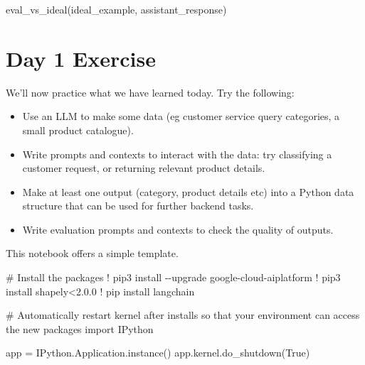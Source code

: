 \documentclass[
  letterpaper,
  DIV=11,
  numbers=noendperiod]{scrreprt}
\newenvironment{Shaded}{\begin{snugshade}}{\end{snugshade}}
\newcommand{\CommentTok}[1]{\textcolor[rgb]{0.37,0.37,0.37}{#1}}
\newcommand{\FloatTok}[1]{\textcolor[rgb]{0.68,0.00,0.00}{#1}}
\newcommand{\ImportTok}[1]{\textcolor[rgb]{0.00,0.46,0.62}{#1}}
\newcommand{\NormalTok}[1]{\textcolor[rgb]{0.00,0.23,0.31}{#1}}
\newcommand{\OperatorTok}[1]{\textcolor[rgb]{0.37,0.37,0.37}{#1}}
\newcommand{\VariableTok}[1]{\textcolor[rgb]{0.07,0.07,0.07}{#1}}
\begin{document}
\begin{Shaded}
\begin{Highlighting}[]
\NormalTok{eval\_vs\_ideal(ideal\_example, assistant\_response)}
\end{Highlighting}
\end{Shaded}


\hypertarget{day-1-exercise}{%
\chapter{Day 1 Exercise}\label{day-1-exercise}}

We'll now practice what we have learned today. Try the following:

\begin{itemize}
\item
  Use an LLM to make some data (eg customer service query categories, a
  small product catalogue).
\item
  Write prompts and contexts to interact with the data: try classifying
  a customer request, or returning relevant product details.
\item
  Make at least one output (category, product details etc) into a Python
  data structure that can be used for further backend tasks.
\item
  Write evaluation prompts and contexts to check the quality of outputs.
\end{itemize}

This notebook offers a simple template.

\begin{Shaded}
\begin{Highlighting}[]
\CommentTok{\# Install the packages}
\OperatorTok{!}\NormalTok{ pip3 install }\OperatorTok{{-}{-}}\NormalTok{upgrade google}\OperatorTok{{-}}\NormalTok{cloud}\OperatorTok{{-}}\NormalTok{aiplatform}
\OperatorTok{!}\NormalTok{ pip3 install shapely}\OperatorTok{\textless{}}\FloatTok{2.0.0}
\OperatorTok{!}\NormalTok{ pip install langchain}
\end{Highlighting}
\end{Shaded}

\begin{Shaded}
\begin{Highlighting}[]
\CommentTok{\# Automatically restart kernel after installs so that your environment can access the new packages}
\ImportTok{import}\NormalTok{ IPython}

\NormalTok{app }\OperatorTok{=}\NormalTok{ IPython.Application.instance()}
\NormalTok{app.kernel.do\_shutdown(}\VariableTok{True}\NormalTok{)}
\end{Highlighting}
\end{Shaded}
\end{document}
